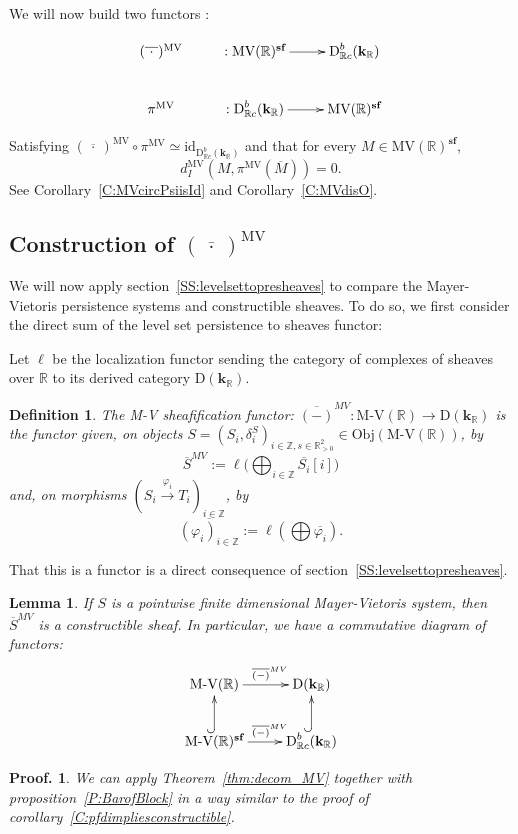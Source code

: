 \documentclass[a4paper, english, 11pt]{article}
\newcommand{\kk}[0]{\textbf{k}}
\newcommand{\0}{\vec{0}}
\newcommand{\R}[0]{\mathbb{R}}
\newcommand{\Z}[0]{\mathbb{Z}}
\newcommand{\D}[0]{\text{D}}
\newcommand{\Obj}[0]{\text{Obj}}
\newcommand{\MV}{\text{MV}}
\newcommand{\s}{\textbf{sf}}
\newtheorem*{pf}{Proof.} }
\newtheorem{lem}[prop]{Lemma}
\newtheorem{defi}[prop]{Definition}
\begin{document}
We will now  build two functors : 


$$\xymatrix{
(\overline{~\cdot~ })^{\text{MV}} & : \text{MV}(\R)^\s \ar[r] &\D^b_{\R c}(\kk_\R)  \\
\pi^{\text{MV}}  & : \D^b_{\R c}(\kk_\R) \ar[r] & \text{MV}(\R)^\s 
}$$

Satisfying $(\overline{~\cdot~ })^{\text{MV}} \circ \pi^{\text{MV}} \simeq \text{id}_{\D^b_{\R c}(\kk_\R)}$ and that for every $M\in \text{MV}(\R)^\s$, $$d_I^{\text{MV}}(M, \pi^\MV ( \overline{M})) = 0.$$
See Corollary~\ref{C:MVcircPsiisId} and Corollary~\ref{C:MVdisO}.
\subsection{Construction of $(\overline{~\cdot~ })^{\text{MV}}$}\label{SS:MVfunctor}
We will now apply section~\ref{SS:levelsettopresheaves} to compare the Mayer-Vietoris persistence systems and constructible sheaves. To do so, we first consider the direct sum of the level set persistence to sheaves functor: 

Let $\ell$ be the localization functor sending the category of complexes of sheaves over $\R$ to its derived category $\D(\kk_\R)$.
\begin{defi}\label{D:MVtoSheaves} The \emph{M-V sheafification functor}: $\overline{(-)}^{MV}: \text{M-V}(\R) \to  \D(\kk_\R)$ is the functor given, on
objects $S=(S_i, \delta_i^S)_{i\in \Z, s\in \R^2_{>0}}\in \Obj(\text{M-V}(\R))$, by 
$$ \overline{S}^{MV} := \ell\Big(\bigoplus_{i\in \Z} \overline{S_i}[i]\Big)$$ and, on morphisms $(S_i\stackrel{\varphi_i}\to T_i)_{i\in \Z}$, by 
$$\overline{(\varphi_i)_{i\in \Z}} := \ell\left(\bigoplus \overline{\varphi_i}\right). $$ 
\end{defi}
That this is a functor is a direct consequence of section~\ref{SS:levelsettopresheaves}.

\begin{lem}
 If $S$ is a pointwise finite dimensional Mayer-Vietoris system, then $\overline{S}^{MV}$ is a constructible sheaf. In particular, we have a commutative diagram of functors:
 $$\xymatrix{ \text{M-V}(\R) \ar[r]^{\quad\overline{(-)}^{MV}} & \D(\kk_\R) \\ 
 \text{M-V}(\R)^{\s} \ar@{^{(}->}[u]\ar[r]^{\quad\overline{(-)}^{MV}} & \D^b_{\R c}(\kk_\R) \ar@{^{(}->}[u].}  $$
\end{lem}
\begin{pf}
 We can apply Theorem~\ref{thm:decom_MV} together with proposition~\ref{P:BarofBlock} in a way similar to the proof of corollary~\ref{C:pfdimpliesconstructible}.
\end{pf}
\end{document}
